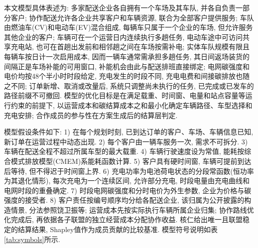 \documentclass{setp-new}
\begin{document}
本文模型具体表述为:
多家配送企业各自拥有一个车场及其车队, 并各自负责一部分客户;
协作配送允许各企业共享客户和车辆资源, 联合为全部客户提供服务;
车队由燃油车(CV)和电动车(EV)混合组成, 每辆车只属于一个企业的车场, 但允许服务其他企业的客户;
车辆可在一个运营日内连续执行多趟任务,
电动车途中可访问共享充电站, 也可在首趟出发前和相邻趟之间在车场按需补电;
实体车队规模有限且每辆车按日计一次启用成本, 因而一辆车通常需承担多趟任务,
其日间返场装货的间隔正是车场补能的可用窗口, 补能机会由此与配送排班直接绑定;
电网碳强度和电价均按48个半小时时段给定,
充电发生的时段不同, 充电电费和间接碳排放也随之不同;
订单新增、取消或改量后, 系统只调整尚未执行的任务, 已完成或已发车的路径前缀不可撤回.
模型的优化目标是在满足载重、时间窗、电量和站点容量等运行约束的前提下,
以运营成本和碳结算成本之和最小化确定车辆路径、车型选择和充电安排;
合作成员的参与性在方案生成后的结算层判定.

模型假设条件如下:
1) 在每个规划时刻, 已到达订单的客户、车场、车辆信息已知, 新订单在运营过程中动态出现.
2) 每个客户由一辆车服务一次, 需求不可拆分.
3) 车辆在配送全程不超过所属车型的最大载重.
4) 车辆行驶速度设为常值, 能耗按综合模式排放模型(CMEM)系能耗函数\cite{ref:27,ref:36}计算.
5) 客户具有硬时间窗, 车辆可提前到达后等待, 但不得迟于时间窗上界.
6) 充电功率为电池荷电状态的分段常函数(恒功率为其退化情形),
每次充电为一个连续区间, 允许部分充电, 时段电量由充电曲线和电网时段的重叠确定.
7) 时段电网碳强度和分时电价为外生参数, 企业为价格与碳强度的接受者.
8) 客户责任按编号顺序均分给各配送企业, 该归属为公开披露的构造情景, 分法参照饶卫振等\cite{ref:91};
运营成本先按实际执行车辆所属企业归集;
协作路线优化完成后, 再依据各子联盟的独立经营成本分配协作收益.
核仁给出唯一且联盟稳定的结算结果, Shapley值作为成员贡献的比较基准.
模型符号说明如表\ref{tab:symbols}所示.
\end{document}
